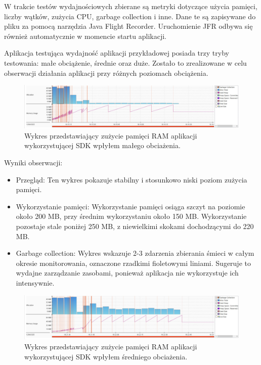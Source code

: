 \documentclass[runningheads,12pt]{llncs}
\begin{document}
W trakcie testów wydajnościowych zbierane są metryki dotyczące użycia pamięci, liczby wątków, zużycia CPU, garbage collection i inne. Dane te są zapisywane do pliku za pomocą narzędzia Java Flight Recorder. Uruchomienie JFR odbywa się również automatycznie w momencie startu aplikacji.

Aplikacja testująca wydajność aplikacji przykładowej posiada trzy tryby testowania: małe obciążenie, średnie oraz duże. Zostało to zrealizowane w celu obserwacji działania aplikacji przy różnych poziomach obciążenia.

\newpage


\begin{figure}
    \includegraphics[width=\linewidth]{images/sdk-memory-low-graph.jpg}
    \caption{Wykres przedstawiający zużycie pamięci  RAM aplikacji wykorzystującej SDK wpłyłem małego obciażenia.} \label{fig1}
\end{figure}

Wyniki obserwacji:

\begin{itemize}
    \item Przegląd: Ten wykres pokazuje stabilny i stosunkowo niski poziom zużycia pamięci.
    \item Wykorzystanie pamięci: Wykorzystanie pamięci osiąga szczyt na poziomie około 200 MB, przy średnim wykorzystaniu około 150 MB. Wykorzystanie pozostaje stale poniżej 250 MB, z niewielkimi skokami dochodzącymi do 220 MB.
    \item Garbage collection: Wykres wskazuje 2-3 zdarzenia zbierania śmieci w całym okresie monitorowania, oznaczone rzadkimi fioletowymi liniami. Sugeruje to wydajne zarządzanie zasobami, ponieważ aplikacja nie wykorzystuje ich intensywnie.
\end{itemize}

\newpage

\begin{figure}
    \includegraphics[width=\linewidth]{images/sdk-memory-middle-graph.jpg}
    \caption{Wykres przedstawiający zużycie pamięci  RAM aplikacji wykorzystującej SDK wpłyłem średniego obciażenia.} \label{fig1}
\end{figure}
\end{document}
